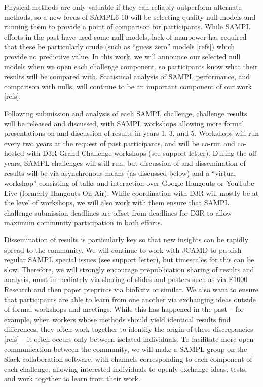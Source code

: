 \documentclass[11pt]{article}
\begin{document}
Physical methods are only valuable if they can reliably outperform alternate methods, so a new focus of SAMPL6-10 will be selecting quality null models and running them to provide a point of comparison for participants.
While SAMPL efforts in the past have used some null models, lack of manpower has required that these be particularly crude (such as ``guess zero'' models [refs]) which provide no predictive value. 
In this work, we will announce our selected null models when we open each challenge component, so participants know what their results will be compared with.
Statistical analysis of SAMPL performance, and comparison with nulls, will continue to be an important component of our work [refs].

Following submission and analysis of each SAMPL challenge, challenge results will be released and discussed, with SAMPL workshops allowing more formal presentations on and discussion of results in years 1, 3, and 5. 
Workshops will run every two years at the request of past participants, and will be co-run and co-hosted with D3R Grand Challenge workshops (see support letter).
During the off years, SAMPL challenges will still run, but discussion of and dissemination of results will be via asynchronous means (as discussed below) and a ``virtual workshop'' consisting of talks and interaction over Google Hangouts or YouTube Live (formerly Hangouts On Air).
While coordination with D3R will mostly be at the level of workshops, we will also work with them ensure that SAMPL challenge submission deadlines are offset from deadlines for D3R to allow maximum community participation in both efforts.

Dissemination of results is particularly key so that new insights can be rapidly spread to the community.
We will continue to work with JCAMD to publish regular SAMPL special issues (see support letter), but timescales for this can be slow.
Therefore, we will strongly encourage prepublication sharing of results and analysis, most immediately via sharing of slides and posters such as via F1000 Research and then paper preprints via bioRxiv or similar.
We also want to ensure that participants are able to learn from one another via exchanging ideas outside of formal workshops and meetings.
While this has happened in the past -- for example, when workers whose methods should yield identical results find differences, they often work together to identify the origin of these discrepancies [refs] -- it often occurs only between isolated individuals.
To facilitate more open communication between the community, we will make a SAMPL group on the Slack collaboration software, with channels corresponding to each component of each challenge, allowing interested individuals to openly exchange ideas, tests, and work together to learn from their work.
\end{document}
